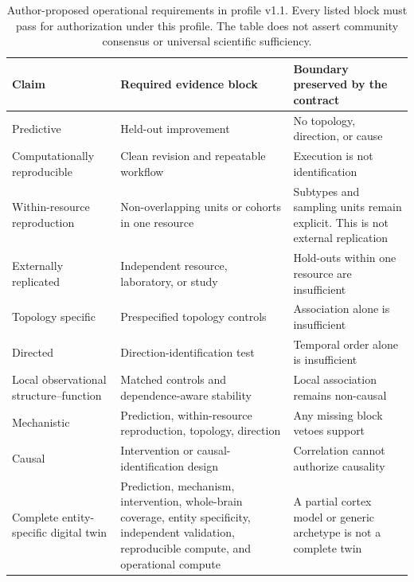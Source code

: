 \begin{table}[t!]
\centering
\caption{Author-proposed operational requirements in profile v1.1. Every listed block must pass for authorization under this profile. The table does not assert community consensus or universal scientific sufficiency.}
\label{tab:claim-semantics}
\footnotesize
\renewcommand{\arraystretch}{1.02}
\begin{tabularx}{\textwidth}{@{}>{\raggedright\arraybackslash}p{}YY@{}}
\toprule
Claim & Required evidence block & Boundary preserved by the contract \\
\midrule
Predictive & Held-out improvement & No topology, direction, or cause \\
Computationally reproducible & Clean revision and repeatable workflow & Execution is not identification \\
Within-resource reproduction & Non-overlapping units or cohorts in one resource & Subtypes and sampling units remain explicit. This is not external replication \\
Externally replicated & Independent resource, laboratory, or study & Hold-outs within one resource are insufficient \\
Topology specific & Prespecified topology controls & Association alone is insufficient \\
Directed & Direction-identification test & Temporal order alone is insufficient \\
Local observational structure--function & Matched controls and dependence-aware stability & Local association remains non-causal \\
Mechanistic & Prediction, within-resource reproduction, topology, direction & Any missing block vetoes support \\
Causal & Intervention or causal-identification design & Correlation cannot authorize causality \\
Complete entity-specific digital twin & Prediction, mechanism, intervention, whole-brain coverage, entity specificity, independent validation, reproducible compute, and operational compute & A partial cortex model or generic archetype is not a complete twin \\
\bottomrule
\end{tabularx}
\end{table}
